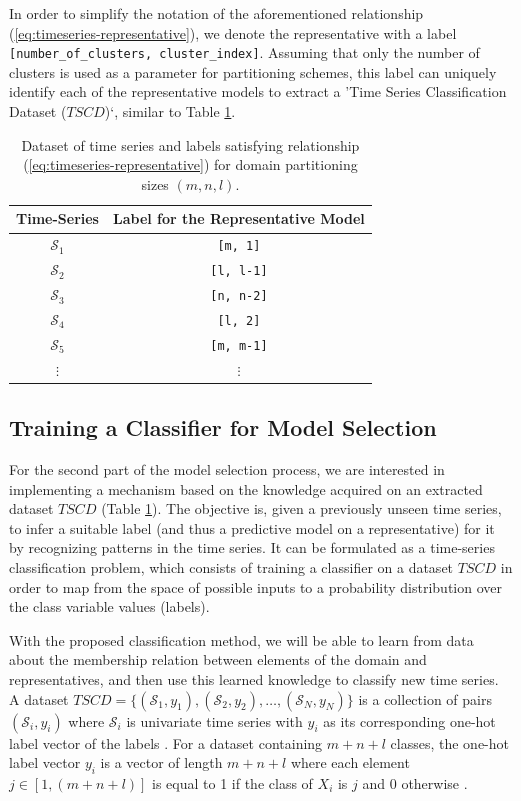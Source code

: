 In order to simplify the notation of the aforementioned relationship (\ref{eq:timeseries-representative}), we denote the representative with a label \texttt{[number\_of\_clusters, cluster\_index]}. Assuming that only the number of clusters is used as a parameter for partitioning schemes, this label can uniquely identify each of the representative models to extract a 'Time Series Classification Dataset ($TSCD$)`, similar to Table \ref{Tab:TSClassificationDataset}.

\begin{table}[h]
	\centering
	\begin{tabular}{|c|c|}
		\hline
		Time-Series & Label for the Representative Model\\ \hline
		$\mathcal{S}_{1}$ & \texttt{[m, 1]} \\ \hline
		$\mathcal{S}_{2}$ & \texttt{[l, l-1]} \\ \hline
		$\mathcal{S}_{3}$ & \texttt{[n, n-2]} \\ \hline
		$\mathcal{S}_{4}$ & \texttt{[l, 2]} \\ \hline
		$\mathcal{S}_{5}$ & \texttt{[m, m-1]} \\ \hline
		$\vdots$ & $\vdots$ \\ \hline
	\end{tabular}
	\caption{Dataset of time series and labels satisfying relationship (\ref{eq:timeseries-representative}) for domain partitioning sizes $(m,n,l)$.}
	\label{Tab:TSClassificationDataset}
\end{table}

\subsection{Training a Classifier for Model Selection}
\label{Sec:TrainingClassifier}

For the second part of the model selection process, we are interested in implementing a mechanism based on the knowledge acquired on an extracted dataset $TSCD$ (Table \ref{Tab:TSClassificationDataset}). The objective is, given a previously unseen time series, to infer a suitable label (and thus a predictive model on a representative) for it by recognizing patterns in the time series. It can be formulated as a time-series classification problem, which consists of training a classifier on a dataset $TSCD$ in order to map from the space of possible inputs to a probability distribution over the class variable values (labels).  

With the proposed classification method, we will be able to learn from data about the membership relation between elements of the domain and representatives, and then use this learned knowledge to classify new time series. A dataset $TSCD=\{(\mathcal{S}_1,y_1),(\mathcal{S}_2,y_2), \ldots ,(\mathcal{S}_N,y_N)\}$ is a collection of pairs $(\mathcal{S}_i,y_i)$ where $\mathcal{S}_i$ is univariate time series with $y_i$ as its corresponding one-hot label vector of the labels \cite{Gulli2017}. For a dataset containing $m+n+l$ classes, the one-hot label vector $y_i$ is a vector of length $m+n+l$ where each element $j \in [1,(m+n+l)]$ is equal to 1 if the class of $X_i$ is $j$ and $0$ otherwise \cite{Mitsa2010}.

